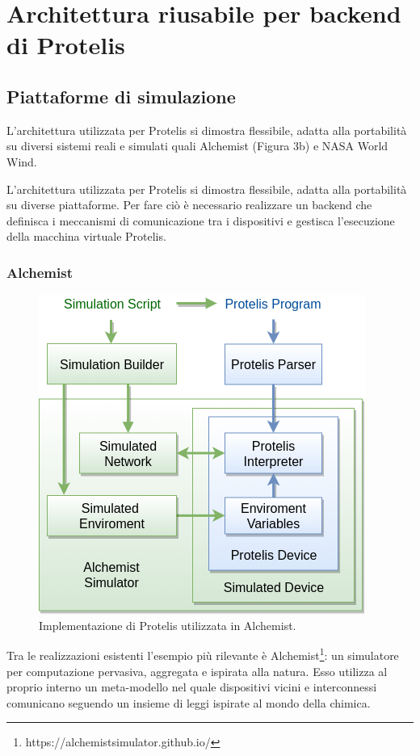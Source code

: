 \chapter{Architettura riusabile per backend di Protelis}
\section{Piattaforme di simulazione}
L'architettura utilizzata per Protelis si dimostra flessibile, adatta alla
portabilità su diversi sistemi reali\cite{Clark2015} e simulati quali
Alchemist\cite{alchemist} (Figura 3b) e NASA World Wind\cite{Bell2007}.

L'architettura utilizzata per Protelis si dimostra flessibile, adatta alla
portabilità su diverse piattaforme. Per fare ciò è necessario realizzare un
backend che definisca i meccanismi di comunicazione tra i dispositivi e
gestisca l'esecuzione della macchina virtuale Protelis.

\subsection{Alchemist}
\begin{figure}
  \centering
  \includegraphics[width=0.7\linewidth]{media/alchemist-architecture.png}
  \caption{Implementazione di Protelis utilizzata in Alchemist.}
\end{figure}
Tra le realizzazioni esistenti l'esempio più rilevante è
Alchemist\footnote{https://alchemistsimulator.github.io/}: un simulatore per
computazione pervasiva, aggregata e ispirata alla natura. Esso utilizza al
proprio interno un meta-modello nel quale dispositivi vicini e interconnessi
comunicano seguendo un insieme di leggi ispirate al mondo della chimica.


